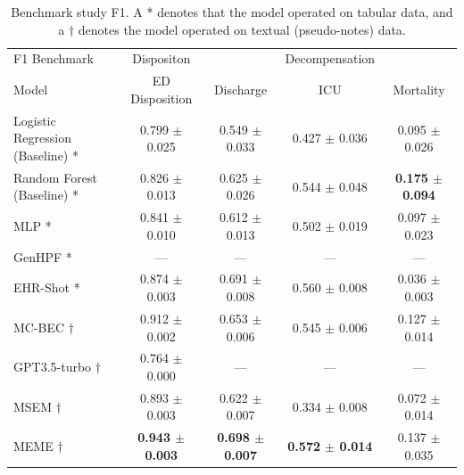 \documentclass[pmlr]{jmlr}%
\begin{document}
\begin{table}[H]
\caption{Benchmark study F1. A * denotes that the model operated on tabular data, and a $\dagger$ denotes the model operated on textual (pseudo-notes) data.}
\label{r1}
\begin{adjustbox}{width=\textwidth}
\begin{small}
\begin{tabular}{l|c|ccc}
\toprule
F1 Benchmark & Dispositon & & Decompensation &\\
Model & ED Disposition & Discharge & ICU & Mortality \\
\midrule
Logistic Regression (Baseline) * &0.799 $\pm$ 0.025&0.549 $\pm$ 0.033& 0.427 $\pm$ 0.036& 0.095 $\pm$ 0.026\\
Random Forest (Baseline) * & 0.826 $\pm$ 0.013 & 0.625 $\pm$ 0.026 & 0.544 $\pm$ 0.048 &  \textbf{0.175 $\pm$ 0.094}  \\
MLP * & 0.841 $\pm$ 0.010 & 0.612 $\pm$ 0.013 & 0.502 $\pm$ 0.019 & 0.097 $\pm$ 0.023 \\
GenHPF \citep{hur2023genhpf} * & --- & --- & ---& --- \\
EHR-Shot\citep{wornow2024ehrshot} *& 0.874 $\pm$ 0.003 & 0.691 $\pm$ 0.008 & 0.560 $\pm$ 0.008 & 0.036 $\pm$ 0.003 \\
MC-BEC\citep{chen2023multimodal} $\dagger$ & 0.912 $\pm$ 0.002& 0.653 $\pm$ 0.006 & 0.545 $\pm$ 0.006 & 0.127 $\pm$ 0.014\\
GPT3.5-turbo $\dagger$ & 0.764 $\pm$ 0.000& --- & --- & ---\\
MSEM $\dagger$& 0.893 $\pm$ 0.003 & 0.622 $\pm$ 0.007 & 0.334 $\pm$ 0.008 & 0.072 $\pm$ 0.014\\
MEME $\dagger$& \textbf{0.943 $\pm$ 0.003} & \textbf{0.698 $\pm$ 0.007} & \textbf{0.572 $\pm$ 0.014} & 0.137 $\pm$ 0.035 \\
\bottomrule
\end{tabular}
\end{small}
\end{adjustbox}
\end{table}
\vspace*{-0.5cm}
\end{document}
